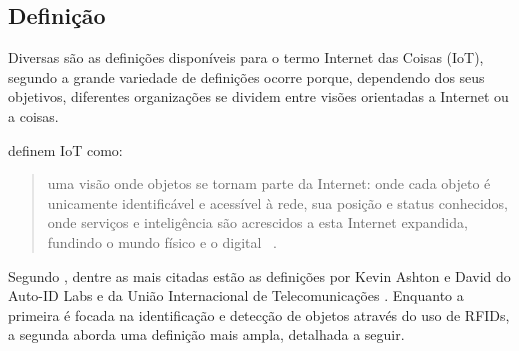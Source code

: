 \documentclass[twoside,english,brazilian]{UNISINOSmonografia}
\begin{document}
\subsection{Definição}
	
		Diversas são as definições disponíveis para o termo Internet das Coisas (IoT), segundo  a grande variedade de definições ocorre porque, dependendo dos seus objetivos, diferentes organizações se dividem entre visões orientadas a Internet ou a coisas.
		
		 definem IoT como:
		
		\begin{quote}
			uma visão onde objetos se tornam parte da Internet: onde cada objeto é unicamente identificável e acessível à rede, sua posição e status conhecidos, onde serviços e inteligência são acrescidos a esta Internet expandida, fundindo o mundo físico e o digital~
			\cite{Coetzee2011}.
		\end{quote}
		
		Segundo , dentre as mais citadas estão as 
		definições por Kevin Ashton e David  do Auto-ID 
		Labs e da União Internacional de Telecomunicações . 
		Enquanto a primeira é focada na identificação e detecção de objetos 
		através do uso de RFIDs, a segunda aborda uma definição 
		mais ampla, detalhada a seguir.
		
\end{document}
